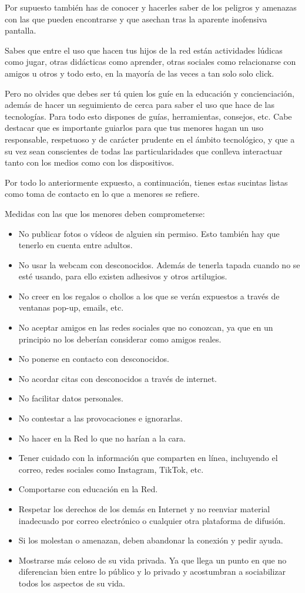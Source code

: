 \documentclass[
  a4paper,
  openany]{book}
\begin{document}
Por supuesto también has de conocer y hacerles saber de los peligros y amenazas con las que pueden encontrarse y que asechan tras la aparente inofensiva pantalla.

Sabes que entre el uso que hacen tus hijos de la red están actividades lúdicas como jugar, otras didácticas como aprender, otras sociales como relacionarse con amigos u otros y todo esto, en la mayoría de las veces a tan solo solo click.

Pero no olvides que debes ser tú quien los guíe en la educación y concienciación, además de hacer un seguimiento de cerca para saber el uso que hace de las tecnologías. Para todo esto dispones de guías, herramientas, consejos, etc. Cabe destacar que es importante guiarlos para que tus menores hagan un uso responsable, respetuoso y de carácter prudente en el ámbito tecnológico, y que a su vez sean conscientes de todas las particularidades que conlleva interactuar tanto con los medios como con los dispositivos.

Por todo lo anteriormente expuesto, a continuación, tienes estas sucintas listas como toma de contacto en lo que a menores se refiere.

Medidas con las que los menores deben comprometerse:

\begin{itemize}
\item
  No publicar fotos o vídeos de alguien sin permiso. Esto también hay que tenerlo en cuenta entre adultos.
\item
  No usar la webcam con desconocidos. Además de tenerla tapada cuando no se esté usando, para ello existen adhesivos y otros artilugios.
\item
  No creer en los regalos o chollos a los que se verán expuestos a través de ventanas pop-up, emails, etc.
\item
  No aceptar amigos en las redes sociales que no conozcan, ya que en un principio no los deberían considerar como amigos reales.
\item
  No ponerse en contacto con desconocidos.
\item
  No acordar citas con desconocidos a través de internet.
\item
  No facilitar datos personales.
\item
  No contestar a las provocaciones e ignorarlas.
\item
  No hacer en la Red lo que no harían a la cara.
\item
  Tener cuidado con la información que comparten en línea, incluyendo el correo, redes sociales como Instagram, TikTok, etc.
\item
  Comportarse con educación en la Red.
\item
  Respetar los derechos de los demás en Internet y no reenviar material inadecuado por correo electrónico o cualquier otra plataforma de difusión.
\item
  Si los molestan o amenazan, deben abandonar la conexión y pedir ayuda.
\item
  Mostrarse más celoso de su vida privada. Ya que llega un punto en que no diferencian bien entre lo público y lo privado y acostumbran a sociabilizar todos los aspectos de su vida.
\end{itemize}
\end{document}
